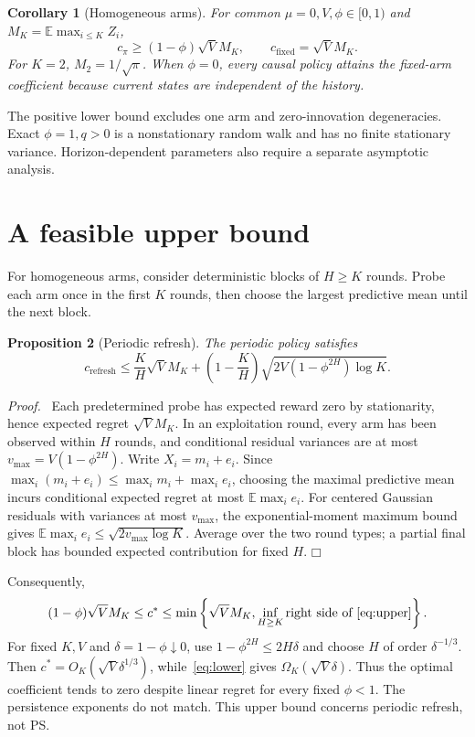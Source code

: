 \documentclass[11pt]{article}
\newtheorem{proposition}{Proposition}
\newtheorem{corollary}[proposition]{Corollary}
\newenvironment{proof}{\par\noindent\textit{Proof.}\ }{\hfill$\mdlgwhtsquare$\par\medskip}
\newcommand{\E}{\mathbb E}
\begin{document}
\begin{corollary}[Homogeneous arms]
For common $\mu=0,V,\phi\in[0,1)$ and $M_K=\E\max_{i\leq K}Z_i$,
\begin{equation}
c_\pi\geq(1-\phi)\sqrt V M_K,
\qquad c_{\mathrm{fixed}}=\sqrt V M_K.
\end{equation}
For $K=2$, $M_2=1/\sqrt\pi$. When $\phi=0$, every causal policy attains the fixed-arm coefficient because current states are independent of the history.
\end{corollary}
The positive lower bound excludes one arm and zero-innovation degeneracies. Exact $\phi=1,q>0$ is a nonstationary random walk and has no finite stationary variance. Horizon-dependent parameters also require a separate asymptotic analysis.

\section{A feasible upper bound}
For homogeneous arms, consider deterministic blocks of $H\geq K$ rounds. Probe each arm once in the first $K$ rounds, then choose the largest predictive mean until the next block.

\begin{proposition}[Periodic refresh]
The periodic policy satisfies
\begin{equation}
c_{\mathrm{refresh}}\leq
\frac K H\sqrt V M_K+
\left(1-\frac K H\right)\sqrt{2V(1-\phi^{2H})\log K}.
\label{eq:upper}
\end{equation}
\end{proposition}
\begin{proof}
Each predetermined probe has expected reward zero by stationarity, hence expected regret $\sqrt V M_K$. In an exploitation round, every arm has been observed within $H$ rounds, and conditional residual variances are at most $v_{\max}=V(1-\phi^{2H})$. Write $X_i=m_i+e_i$. Since $\max_i(m_i+e_i)\leq\max_i m_i+\max_i e_i$, choosing the maximal predictive mean incurs conditional expected regret at most $\E\max_i e_i$. For centered Gaussian residuals with variances at most $v_{\max}$, the exponential-moment maximum bound gives $\E\max_i e_i\leq\sqrt{2v_{\max}\log K}$. Average over the two round types; a partial final block has bounded expected contribution for fixed $H$.
\end{proof}

Consequently,
\begin{equation}
(1-\phi)\sqrt V M_K\leq c^*\leq
\min\left\{\sqrt V M_K,\inf_{H\geq K}\text{right side of~\eqref{eq:upper}}\right\}.
\end{equation}
For fixed $K,V$ and $\delta=1-\phi\downarrow0$, use $1-\phi^{2H}\leq2H\delta$ and choose $H$ of order $\delta^{-1/3}$. Then $c^*=O_K(\sqrt V\delta^{1/3})$, while~\eqref{eq:lower} gives $\Omega_K(\sqrt V\delta)$. Thus the optimal coefficient tends to zero despite linear regret for every fixed $\phi<1$. The persistence exponents do not match. This upper bound concerns periodic refresh, not PS.
\end{document}
